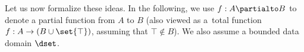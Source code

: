 {%

Let us now formalize these ideas.
In the following, we use $f: A \partialto B$ to denote a partial function from
$A$ to $B$ (also
viewed as a~total function $f: A \to (B \cup \set{\top})$, assuming that $\top
\not\in B$).
We also assume a bounded data domain $\dset$. 

%     
%
%       
%       
%

}
